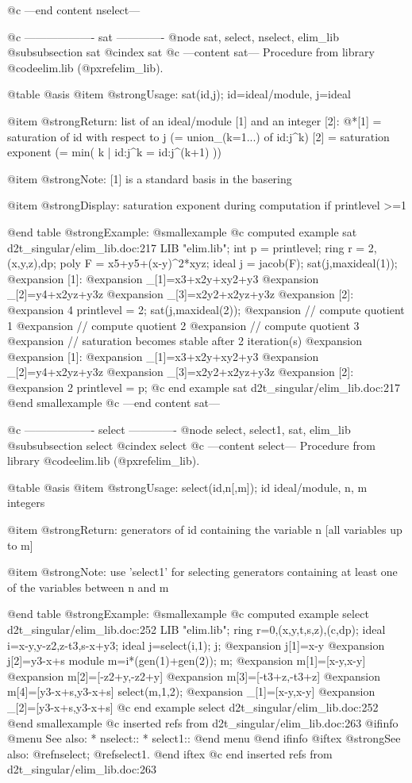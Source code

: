 @c ---end content nselect---

@c ------------------- sat -------------
@node sat, select, nselect, elim_lib
@subsubsection sat
@cindex sat
@c ---content sat---
Procedure from library @code{elim.lib} (@pxref{elim_lib}).

@table @asis
@item @strong{Usage:}
sat(id,j); id=ideal/module, j=ideal

@item @strong{Return:}
list of an ideal/module [1] and an integer [2]:
@*[1] = saturation of id with respect to j (= union_(k=1...) of id:j^k)
[2] = saturation exponent (= min( k | id:j^k = id:j^(k+1) ))

@item @strong{Note:}
[1] is a standard basis in the basering

@item @strong{Display:}
saturation exponent during computation if printlevel >=1

@end table
@strong{Example:}
@smallexample
@c computed example sat d2t_singular/elim_lib.doc:217 
LIB "elim.lib";
int p      = printlevel;
ring r     = 2,(x,y,z),dp;
poly F     = x5+y5+(x-y)^2*xyz;
ideal j    = jacob(F);
sat(j,maxideal(1));
@expansion{} [1]:
@expansion{}    _[1]=x3+x2y+xy2+y3
@expansion{}    _[2]=y4+x2yz+y3z
@expansion{}    _[3]=x2y2+x2yz+y3z
@expansion{} [2]:
@expansion{}    4
printlevel = 2;
sat(j,maxideal(2));
@expansion{} // compute quotient 1
@expansion{} // compute quotient 2
@expansion{} // compute quotient 3
@expansion{} // saturation becomes stable after 2 iteration(s)
@expansion{} 
@expansion{} [1]:
@expansion{}    _[1]=x3+x2y+xy2+y3
@expansion{}    _[2]=y4+x2yz+y3z
@expansion{}    _[3]=x2y2+x2yz+y3z
@expansion{} [2]:
@expansion{}    2
printlevel = p;
@c end example sat d2t_singular/elim_lib.doc:217
@end smallexample
@c ---end content sat---

@c ------------------- select -------------
@node select, select1, sat, elim_lib
@subsubsection select
@cindex select
@c ---content select---
Procedure from library @code{elim.lib} (@pxref{elim_lib}).

@table @asis
@item @strong{Usage:}
select(id,n[,m]); id ideal/module, n, m integers

@item @strong{Return:}
generators of id containing the variable n [all variables up to m]

@item @strong{Note:}
use 'select1' for selecting generators containing at least one of the
variables between n and m

@end table
@strong{Example:}
@smallexample
@c computed example select d2t_singular/elim_lib.doc:252 
LIB "elim.lib";
ring r=0,(x,y,t,s,z),(c,dp);
ideal i=x-y,y-z2,z-t3,s-x+y3;
ideal j=select(i,1);
j;
@expansion{} j[1]=x-y
@expansion{} j[2]=y3-x+s
module m=i*(gen(1)+gen(2));
m;
@expansion{} m[1]=[x-y,x-y]
@expansion{} m[2]=[-z2+y,-z2+y]
@expansion{} m[3]=[-t3+z,-t3+z]
@expansion{} m[4]=[y3-x+s,y3-x+s]
select(m,1,2);
@expansion{} _[1]=[x-y,x-y]
@expansion{} _[2]=[y3-x+s,y3-x+s]
@c end example select d2t_singular/elim_lib.doc:252
@end smallexample
@c inserted refs from d2t_singular/elim_lib.doc:263
@ifinfo
@menu
See also:
* nselect::
* select1::
@end menu
@end ifinfo
@iftex
@strong{See also:}
@ref{nselect};
@ref{select1}.
@end iftex
@c end inserted refs from d2t_singular/elim_lib.doc:263

